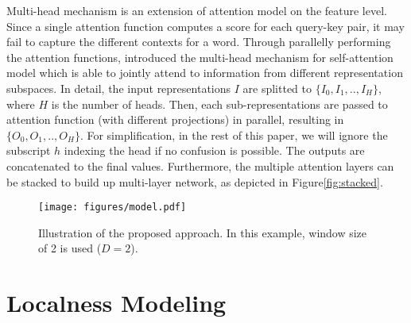 \documentclass[11pt,a4paper]{article}
\begin{document}
Multi-head mechanism is an extension of attention model on the feature level. Since a single attention function computes a score for each query-key pair, it may fail to capture the different contexts for a word. Through parallelly performing the attention functions,  introduced the multi-head mechanism for self-attention model which is able to jointly attend to information from different representation subspaces. In detail, the input representations $I$ are splitted to $\{I_0,I_1,..,I_H\}$, where $H$ is the number of heads. Then, each sub-representations are passed to attention function (with different projections) in parallel, resulting in $\{O_0,O_1,..,O_H\}$. For simplification, in the rest of this paper, we will ignore the subscript $h$ indexing the head if no confusion is possible.  The outputs are concatenated to the final values. Furthermore, the multiple attention layers can be stacked to build up multi-layer network, as depicted in Figure\ref{fig:stacked}. 



































\fi

\begin{figure*}[ht]
\begin{center}
\texttt{[image: figures/model.pdf]}
\caption{
\label{fig:approach}
Illustration of the proposed approach. In this example, window size of 2 is used ($D=2$).
}
\end{center}
\end{figure*} 



\section{Localness Modeling}


\iffalse
From a linguistic intuition, when a word $x_i$ is aligned to another word $x_j$, we also expect $x_i$ to align mainly to the neighboring words of $x_j$, so as to capture phrasal patterns that contain useful local context information. However, since the conventional self-attention models consider all of the words in a sequence, the weighted averaging inhibits the relation among neighboring words especially for a long sequence.
In addition, as a pivotal component of self-attention model, the motivation of multi-head mechanism aims at allowing the model to jointly attend to information from different representation subspaces. However, we argue that adopting global attention may impair the benefit from the multi-head model.  
\fi
\end{document}
